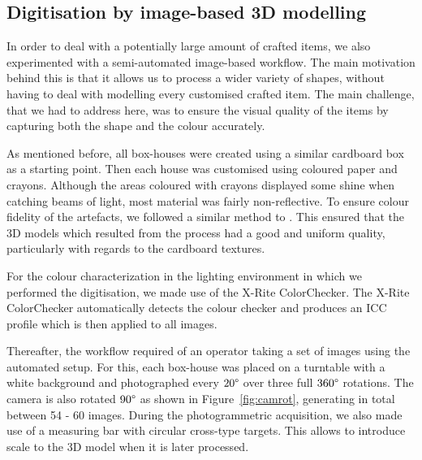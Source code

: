 \documentclass[acmlarge,screen,dvipsnames]{acmart}
\begin{document}



\subsection{Digitisation by image-based 3D modelling}
In order to deal with a potentially large amount of crafted items, we
also experimented with a semi-automated image-based workflow. The main
motivation behind this is that it allows us to process a wider variety
of shapes, without having to deal with modelling every customised crafted item. The main challenge, that we had to address here, was to ensure the visual quality of the items by capturing both the
shape and the colour accurately. 


As mentioned before, all box-houses were created using a similar cardboard box as a starting
point. Then each house was customised using coloured paper and crayons.
Although the areas coloured with crayons displayed some shine when catching
beams of light, most material was fairly non-reflective. To ensure colour fidelity of the
artefacts, we followed a similar method to \cite{Gaiani_2017}. This ensured that the 3D models which resulted from the process had a good and uniform quality, particularly with regards to the cardboard
textures.


For the colour characterization in the lighting environment in which we performed the
digitisation, we made use of the X-Rite ColorChecker. The X-Rite ColorChecker automatically detects the
colour checker and produces an ICC profile which is then applied to all
images.


Thereafter, the workflow required of an operator taking a set of images
using the automated setup. For this, each box-house was placed on a
turntable with a white background and photographed every $20\degree$
over three full $360\degree$ rotations. The camera is also 
rotated $90\degree$ as shown in Figure~\ref{fig:camrot}, generating in total between 54 - 60 images. 
During the photogrammetric acquisition, we also made use of a measuring bar with circular cross-type targets. This
allows to introduce scale to the 3D model when it is later processed.
\end{document}
